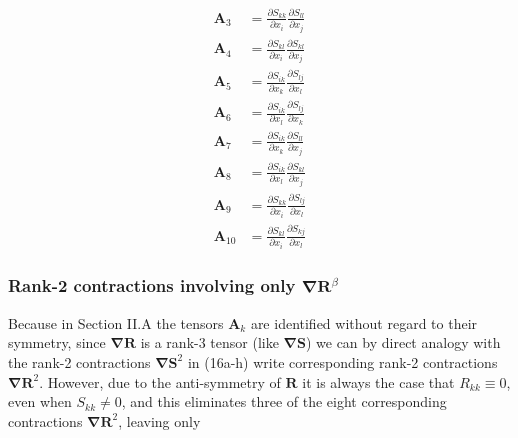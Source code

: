 %
\begin{subequations}
\begin{align}
	\label{E:33}
	\mathbf{A}_3  &= \frac{\partial S_{kk}}{\partial x_i}
					 \frac{\partial S_{ll}}{\partial x_j} \\
	\mathbf{A}_4  &= \frac{\partial S_{kl}}{\partial x_i}
					 \frac{\partial S_{kl}}{\partial x_j} \\
	\mathbf{A}_5  &= \frac{\partial S_{ik}}{\partial x_k}
					 \frac{\partial S_{lj}}{\partial x_l} \\
	\mathbf{A}_6  &= \frac{\partial S_{ik}}{\partial x_l}
					 \frac{\partial S_{lj}}{\partial x_k} \\
	\mathbf{A}_7  &= \frac{\partial S_{ik}}{\partial x_k}
					 \frac{\partial S_{ll}}{\partial x_j} \\
	\mathbf{A}_8  &= \frac{\partial S_{ik}}{\partial x_l}
					 \frac{\partial S_{kl}}{\partial x_j} \\
	\mathbf{A}_9  &= \frac{\partial S_{kk}}{\partial x_i}
					 \frac{\partial S_{lj}}{\partial x_l} \\
	\mathbf{A}_{10} &= \frac{\partial S_{kl}}{\partial x_i}
				     \frac{\partial S_{kj}}{\partial x_l}      
\end{align}
\end{subequations}
%
%    
	 	
\subsubsection{Rank-2 contractions involving only $\mathbf{\nabla R}^{\beta}$}

Because in Section II.A the tensors $\mathbf{A}_k$  are identified without regard to their symmetry, since $\mathbf{\nabla R}$ is a rank-3 tensor (like $\mathbf{\nabla S}$) we can by direct analogy with the rank-2 contractions $\mathbf{\nabla S}^2$  in (16a-h) write corresponding rank-2 contractions $\mathbf{\nabla R}^2$.  However, due to the anti-symmetry of $\mathbf{R}$ it is always the case that $R_{kk} \equiv 0$, even when $S_{kk} \neq 0$, and this eliminates three of the eight corresponding contractions $\mathbf{\nabla R}^2$, leaving only

